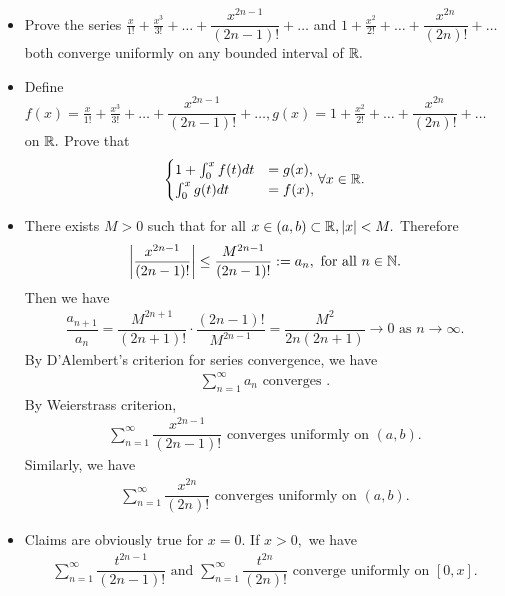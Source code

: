 \begin{problem}
\begin{itemize}
    \item[(a)] Prove the series $\frac{x}{1!}+\frac{x^3}{3!}+\ldots+\dfrac{x^{2n-1}}{(2n-1)!}+\ldots$ and $1+\frac{x^2}{2!}+\ldots+\dfrac{x^{2n}}{(2n)!}+\ldots$ both converge uniformly on any bounded interval of $\mathbb{R}.$
    \item[(b)] Define $f(x)=\frac{x}{1!}+\frac{x^3}{3!}+\ldots+\dfrac{x^{2n-1}}{(2n-1)!}+\ldots,g(x)=1+\frac{x^2}{2!}+\ldots+\dfrac{x^{2n}}{(2n)!}+\ldots$ on $\mathbb{R}.$ Prove that 
    \begin{align*}
        \begin{cases}
        1+\int_0^xf(t)dt&=g(x),\\
        \int_0^xg(t)dt&=f(x),
        \end{cases}\forall x\in\mathbb{R}.
    \end{align*}
\end{itemize}
\begin{solution}
\begin{itemize}
    \item[(a)]There exists $M>0$ such that for all $x\in (a,b)\subset\mathbb{R},|x|<M.$ Therefore 
\begin{align*}
    \left\lvert \dfrac{x^{2n-1}}{(2n-1)!}\right\rvert\le \dfrac{M^{2n-1}}{(2n-1)!}:=a_n,\text{ for all }n\in\mathbb{N}.
\end{align*}
Then we have 
\begin{align*}
    \dfrac{a_{n+1}}{a_n}=\dfrac{M^{2n+1}}{(2n+1)!}\cdot \dfrac{(2n-1)!}{M^{2n-1}}=\dfrac{M^2}{2n(2n+1)}\to 0 \text{ as }n\to \infty.
\end{align*}
By D'Alembert's criterion for series convergence, we have
\begin{align*}
    \sum_{n=1}^\infty a_n\text{ converges }.
\end{align*}
By Weierstrass criterion, 
\begin{align*}
    \sum_{n=1}^\infty \dfrac{x^{2n-1}}{(2n-1)!}\text{ converges uniformly on }(a,b).
\end{align*}
Similarly, we have 
\begin{align*}
    \sum_{n=1}^\infty \dfrac{x^{2n}}{(2n)!}\text{ converges uniformly on }(a,b).
\end{align*}
\item[(b)] Claims are obviously true for $x=0$. If $x>0,$ we have 
\begin{align*}
    \sum_{n=1}^\infty \dfrac{t^{2n-1}}{(2n-1)!}\text{ and }\sum_{n=1}^\infty \dfrac{t^{2n}}{(2n)!} \text{ converge uniformly on }[0,x].

\end{align*}
\end{itemize}
\end{solution}
\end{problem}
